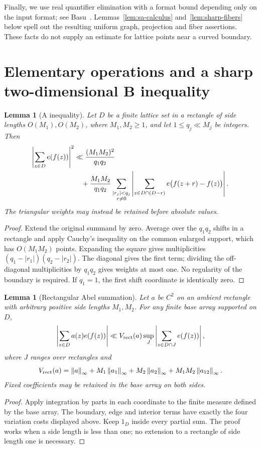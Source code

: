 \documentclass[11pt,a4paper]{article}
\numberwithin{equation}{section}
\newtheorem{lemma}[theorem]{Lemma}
\theoremstyle{remark}
\newcommand{\norm}[1]{\left\lVert #1\right\rVert}
\begin{document}
Finally, we use real quantifier elimination with a format bound depending
only on the input format; see Basu~\cite[Section~2]{Basu}.
Lemmas~\ref{lem:sa-calculus} and~\ref{lem:sharp-fibers} below spell out
the resulting uniform graph, projection and fiber assertions. These
facts do not supply an estimate for lattice points near a curved boundary.

\section{Elementary operations and a sharp two-dimensional B inequality}
\label{sec:operations}

\begin{lemma}[A inequality]\label{lem:A}
Let $D$ be a finite lattice set in a rectangle of side lengths $O(M_1),O(M_2)$,
where $M_1,M_2\ge1$, and let $1\le q_j\ll M_j$ be integers. Then
\begin{align}\label{eq:A2-general}
 \left|\sum_{z\in D}e(f(z))\right|^2
 &\ll \frac{(M_1M_2)^2}{q_1q_2}\notag\\
 &\quad+\frac{M_1M_2}{q_1q_2}
 \sum_{\substack{|r_j|<q_j\\r\ne0}}
 \left|\sum_{z\in D\cap(D-r)}e\bigl(f(z+r)-f(z)\bigr)\right|.
\end{align}
The triangular weights may instead be retained before absolute values.
\end{lemma}
\begin{proof}
Extend the original summand by zero. Average over the $q_1q_2$ shifts in a
rectangle and apply Cauchy's inequality on the common enlarged support, which
has $O(M_1M_2)$ points. Expanding the square gives multiplicities
$(q_1-|r_1|)(q_2-|r_2|)$. The diagonal gives the first term; dividing the
off-diagonal multiplicities by $q_1q_2$ gives weights at most one. No
regularity of the boundary is required. If $q_1=1$, the first shift coordinate
is identically zero.
\end{proof}

\begin{lemma}[Rectangular Abel summation]\label{lem:Abel}
Let $a$ be $C^2$ on an ambient rectangle with arbitrary positive side lengths
$M_1,M_2$. For any finite base array supported on $D$,
\begin{equation}\label{eq:Abel}
 \left|\sum_{z\in D}a(z)e(f(z))\right|
 \ll V_{\rm rect}(a)
 \sup_J\left|\sum_{z\in D\cap J}e(f(z))\right|,
\end{equation}
where $J$ ranges over rectangles and
\[
 V_{\rm rect}(a)=\norm a_\infty
 +M_1\norm{a_1}_\infty+M_2\norm{a_2}_\infty
 +M_1M_2\norm{a_{12}}_\infty.
\]
Fixed coefficients may be retained in the base array on both sides.
\end{lemma}
\begin{proof}
Apply integration by parts in each coordinate to the finite measure defined
by the base array. The boundary, edge and interior terms have exactly the
four variation costs displayed above. Keep $1_D$ inside every partial sum.
The proof works when a side length is less than one; no extension to a
rectangle of side length one is necessary.
\end{proof}
\end{document}
